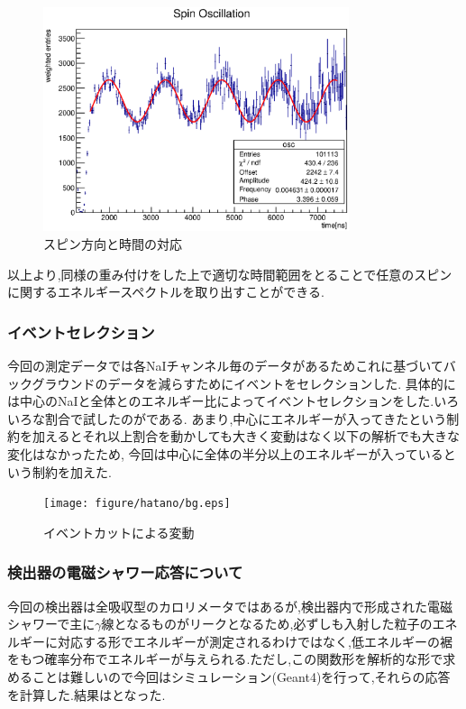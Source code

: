 \begin{figure}[bht]
  \centering
  \includegraphics[width=0.8\textwidth]{figure/hatano/oscillation.eps}
  \caption{スピン方向と時間の対応}
  \label{hatano_fig:oscillation}
\end{figure}

以上より,同様の重み付けをした上で適切な時間範囲をとることで任意のスピンに関するエネルギースペクトルを取り出すことができる.

\subsubsection{イベントセレクション}
今回の測定データでは各NaIチャンネル毎のデータがあるためこれに基づいてバックグラウンドのデータを減らすためにイベントをセレクションした.
具体的には中心のNaIと全体とのエネルギー比によってイベントセレクションをした.いろいろな割合で試したのがである.
あまり,中心にエネルギーが入ってきたという制約を加えるとそれ以上割合を動かしても大きく変動はなく以下の解析でも大きな変化はなかったため,
今回は中心に全体の半分以上のエネルギーが入っているという制約を加えた.

\begin{figure}[bht]
  \centering
  \texttt{[image: figure/hatano/bg.eps]}
  \caption{イベントカットによる変動}
  \label{hatano_fig:bg}
\end{figure}

\subsubsection{検出器の電磁シャワー応答について}
今回の検出器は全吸収型のカロリメータではあるが,検出器内で形成された電磁シャワーで主に$\gamma$線となるものがリークとなるため,必ずしも入射した粒子のエネルギーに対応する形でエネルギーが測定されるわけではなく,低エネルギーの裾をもつ確率分布でエネルギーが与えられる.ただし,この関数形を解析的な形で求めることは難しいので今回はシミュレーション(Geant4)を行って,それらの応答を計算した.結果はとなった.

